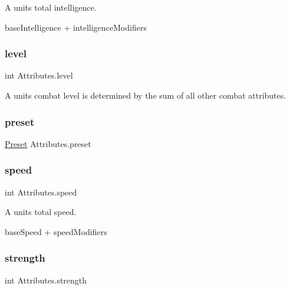 A unit\textquotesingle{}s total intelligence. 

base\+Intelligence + intelligence\+Modifiers\mbox{\label{class_attributes_a1ff4257de32284cf7489849787cb82fb}} 
\subsubsection{\texorpdfstring{level}{level}}
{\footnotesize\ttfamily int Attributes.\+level\hspace{0.3cm}{\ttfamily [get]}}



A unit\textquotesingle{}s combat level is determined by the sum of all other combat attributes. 

\mbox{\label{class_attributes_ad6b0d037f9b58413a7cb7be3065cf743}} 
\subsubsection{\texorpdfstring{preset}{preset}}
{\footnotesize\ttfamily \mbox{\hyperlink{class_attributes_a2dcc4757e5dd7b7d518f43f4f194d175}{Preset}} Attributes.\+preset\hspace{0.3cm}{\ttfamily [get]}}

\mbox{\label{class_attributes_aa67231ed5d1163506d8d2d559a98e125}} 
\subsubsection{\texorpdfstring{speed}{speed}}
{\footnotesize\ttfamily int Attributes.\+speed\hspace{0.3cm}{\ttfamily [get]}}



A unit\textquotesingle{}s total speed. 

base\+Speed + speed\+Modifiers\mbox{\label{class_attributes_a80e15a2316352cfba56fc1d4077dd432}} 
\subsubsection{\texorpdfstring{strength}{strength}}
{\footnotesize\ttfamily int Attributes.\+strength\hspace{0.3cm}{\ttfamily [get]}}



